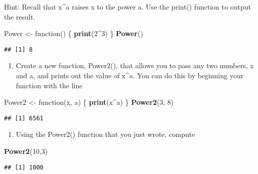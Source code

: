 \documentclass[]{article}
\newenvironment{Shaded}{\begin{snugshade}}{\end{snugshade}}
\newcommand{\KeywordTok}[1]{\textcolor[rgb]{0.13,0.29,0.53}{\textbf{{#1}}}}
\newcommand{\DecValTok}[1]{\textcolor[rgb]{0.00,0.00,0.81}{{#1}}}
\newcommand{\StringTok}[1]{\textcolor[rgb]{0.31,0.60,0.02}{{#1}}}
\newcommand{\NormalTok}[1]{{#1}}
\providecommand{\tightlist}{%
  \setlength{\itemsep}{0pt}\setlength{\parskip}{0pt}}
\begin{document}
Hint: Recall that x\^{}a raises x to the power a. Use the print()
function to output the result.

\begin{Shaded}
\begin{Highlighting}[]
\NormalTok{Power <-}\StringTok{ }\NormalTok{function() \{}
    \KeywordTok{print}\NormalTok{(}\DecValTok{2}\NormalTok{^}\DecValTok{3}\NormalTok{)}
\NormalTok{\}}
\KeywordTok{Power}\NormalTok{()}
\end{Highlighting}
\end{Shaded}

\begin{verbatim}
## [1] 8
\end{verbatim}

\begin{enumerate}
\def\labelenumi{(\alph{enumi})}
\setcounter{enumi}{1}
\tightlist
\item
  Create a new function, Power2(), that allows you to pass any two
  numbers, x and a, and prints out the value of x\^{}a. You can do this
  by beginning your function with the line
\end{enumerate}

\begin{Shaded}
\begin{Highlighting}[]
\NormalTok{Power2 <-}\StringTok{ }\NormalTok{function(x, a) \{}
    \KeywordTok{print}\NormalTok{(x^a)}
\NormalTok{\}}
\KeywordTok{Power2}\NormalTok{(}\DecValTok{3}\NormalTok{, }\DecValTok{8}\NormalTok{)}
\end{Highlighting}
\end{Shaded}

\begin{verbatim}
## [1] 6561
\end{verbatim}

\begin{enumerate}
\def\labelenumi{(\alph{enumi})}
\setcounter{enumi}{2}
\tightlist
\item
  Using the Power2() function that you just wrote, compute
\end{enumerate}

\begin{Shaded}
\begin{Highlighting}[]
\KeywordTok{Power2}\NormalTok{(}\DecValTok{10}\NormalTok{,}\DecValTok{3}\NormalTok{)}
\end{Highlighting}
\end{Shaded}

\begin{verbatim}
## [1] 1000
\end{verbatim}
\end{document}
